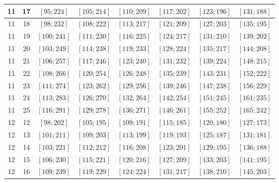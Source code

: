 \documentclass[a4paper,12pt]{article}
\begin{document}
\begin{center}
{\begin{longtable}[H]{|c|c|c|c|c|c|c|c|}
11 &  17 &  $\left[ 95; 224\right]$ &  $\left[ 105; 214\right]$ &  $\left[ 110; 209\right]$ &  $\left[ 117; 202\right]$ &  $\left[ 123; 196\right]$ &  $\left[ 131; 188\right]$ \tabularnewline \hline
11 &  18 &  $\left[ 98; 232\right]$ &  $\left[ 108; 222\right]$ &  $\left[ 113; 217\right]$ &  $\left[ 121; 209\right]$ &  $\left[ 127; 203\right]$ &  $\left[ 135; 195\right]$ \tabularnewline \hline
11 &  19 &  $\left[ 100; 241\right]$ &  $\left[ 111; 230\right]$ &  $\left[ 116; 225\right]$ &  $\left[ 124; 217\right]$ &  $\left[ 131; 210\right]$ &  $\left[ 139; 202\right]$ \tabularnewline \hline
11 &  20 &  $\left[ 103; 249\right]$ &  $\left[ 114; 238\right]$ &  $\left[ 119; 233\right]$ &  $\left[ 128; 224\right]$ &  $\left[ 135; 217\right]$ &  $\left[ 144; 208\right]$ \tabularnewline \hline
11 &  21 &  $\left[ 106; 257\right]$ &  $\left[ 117; 246\right]$ &  $\left[ 123; 240\right]$ &  $\left[ 131; 232\right]$ &  $\left[ 139; 224\right]$ &  $\left[ 148; 215\right]$ \tabularnewline \hline
11 &  22 &  $\left[ 108; 266\right]$ &  $\left[ 120; 254\right]$ &  $\left[ 126; 248\right]$ &  $\left[ 135; 239\right]$ &  $\left[ 143; 231\right]$ &  $\left[ 152; 222\right]$ \tabularnewline \hline
11 &  23 &  $\left[ 111; 274\right]$ &  $\left[ 123; 262\right]$ &  $\left[ 129; 256\right]$ &  $\left[ 139; 246\right]$ &  $\left[ 147; 238\right]$ &  $\left[ 156; 229\right]$ \tabularnewline \hline
11 &  24 &  $\left[ 113; 283\right]$ &  $\left[ 126; 270\right]$ &  $\left[ 132; 264\right]$ &  $\left[ 142; 254\right]$ &  $\left[ 151; 245\right]$ &  $\left[ 161; 235\right]$ \tabularnewline \hline
11 &  25 &  $\left[ 116; 291\right]$ &  $\left[ 129; 278\right]$ &  $\left[ 136; 271\right]$ &  $\left[ 146; 261\right]$ &  $\left[ 155; 252\right]$ &  $\left[ 165; 242\right]$ \tabularnewline \hline
12 &  12 &  $\left[ 98; 202\right]$ &  $\left[ 105; 195\right]$ &  $\left[ 109; 191\right]$ &  $\left[ 115; 185\right]$ &  $\left[ 120; 180\right]$ &  $\left[ 127; 173\right]$ \tabularnewline \hline
12 &  13 &  $\left[ 101; 211\right]$ &  $\left[ 109; 203\right]$ &  $\left[ 113; 199\right]$ &  $\left[ 119; 193\right]$ &  $\left[ 125; 187\right]$ &  $\left[ 131; 181\right]$ \tabularnewline \hline
12 &  14 &  $\left[ 103; 221\right]$ &  $\left[ 112; 212\right]$ &  $\left[ 116; 208\right]$ &  $\left[ 123; 201\right]$ &  $\left[ 129; 195\right]$ &  $\left[ 136; 188\right]$ \tabularnewline \hline
12 &  15 &  $\left[ 106; 230\right]$ &  $\left[ 115; 221\right]$ &  $\left[ 120; 216\right]$ &  $\left[ 127; 209\right]$ &  $\left[ 133; 203\right]$ &  $\left[ 141; 195\right]$ \tabularnewline \hline
12 &  16 &  $\left[ 109; 239\right]$ &  $\left[ 119; 229\right]$ &  $\left[ 124; 224\right]$ &  $\left[ 131; 217\right]$ &  $\left[ 138; 210\right]$ &  $\left[ 145; 203\right]$ \tabularnewline \hline

\end{longtable}}
\end{center}
\end{document}
